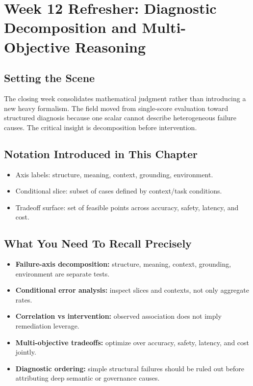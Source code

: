 \section{Week 12 Refresher: Diagnostic Decomposition and Multi-Objective Reasoning}

\subsection*{Setting the Scene}
The closing week consolidates mathematical judgment rather than introducing a new heavy formalism. The field moved from single-score evaluation toward structured diagnosis because one scalar cannot describe heterogeneous failure causes. The critical insight is decomposition before intervention.

\subsection*{Notation Introduced in This Chapter}
\begin{itemize}[leftmargin=1.5em]
  \item Axis labels: structure, meaning, context, grounding, environment.
  \item Conditional slice: subset of cases defined by context/task conditions.
  \item Tradeoff surface: set of feasible points across accuracy, safety, latency, and cost.
\end{itemize}

\subsection*{What You Need To Recall Precisely}
\begin{itemize}[leftmargin=1.5em]
  \item \textbf{Failure-axis decomposition:} structure, meaning, context, grounding, environment are separate tests.
  \item \textbf{Conditional error analysis:} inspect slices and contexts, not only aggregate rates.
  \item \textbf{Correlation vs intervention:} observed association does not imply remediation leverage.
  \item \textbf{Multi-objective tradeoffs:} optimize over accuracy, safety, latency, and cost jointly.
  \item \textbf{Diagnostic ordering:} simple structural failures should be ruled out before attributing deep semantic or governance causes.
\end{itemize}

